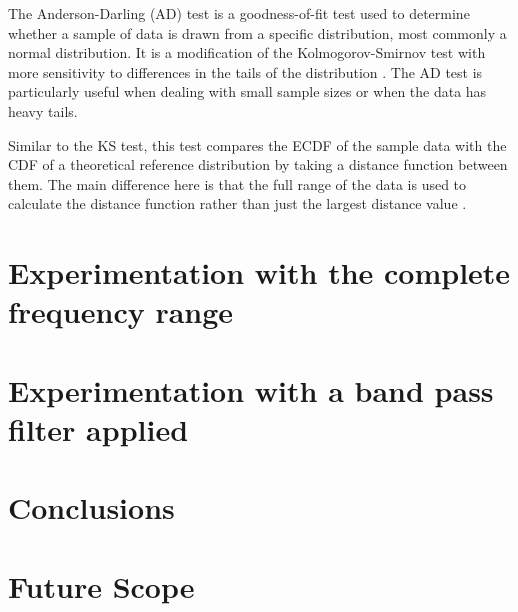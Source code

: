 \documentclass[12pt]{article}
\begin{document}
The Anderson-Darling (AD) test is a goodness-of-fit test used to determine whether a sample of data is drawn from a specific distribution, most commonly a normal distribution. It is a modification of the Kolmogorov-Smirnov test with more sensitivity to differences in the tails of the distribution \cite{guthrie_nistsematech_2020, Michael_2025_statsref}. The AD test is particularly useful when dealing with small sample sizes or when the data has heavy tails.

\medskip
\noindent Similar to the KS test, this test compares the ECDF of the sample data with the CDF of a theoretical reference distribution by taking a distance function between them. The main difference here is that the full range of the data is used to calculate the distance function rather than just the largest distance value \cite{Michael_2025_statsref}. 



\section{Experimentation with the complete frequency range}\label{Experiment_1}
\section{Experimentation with a band pass filter applied}\label{Experiment_2}


\section{Conclusions}\label{Conclusions}

\section{Future Scope}\label{Future Scope}

\end{document}
